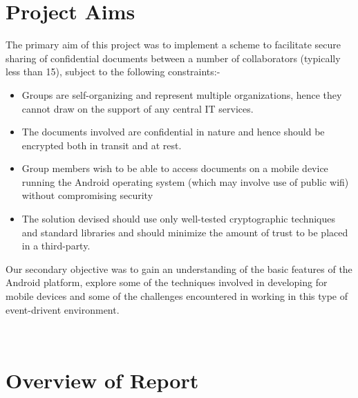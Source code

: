 \section{Project Aims}
\label{sec:aims}
The primary aim of this project was to implement a scheme to facilitate secure sharing of confidential documents between a number of collaborators (typically less than 15), subject to the following constraints:-
\begin{itemize}
\item Groups are self-organizing and represent multiple organizations, hence they cannot draw on the support of any central IT services.
\item The documents involved are confidential in nature and hence should be encrypted both in transit and at rest.
\item Group members wish to be able to access documents on a mobile device running the Android operating system (which may involve use of public wifi) without compromising security 
\item The solution devised should use only well-tested cryptographic techniques and standard libraries and should minimize the amount of trust to be placed in a third-party.
\end{itemize}

Our secondary objective was to gain an understanding of the basic features of the Android platform, explore some of the techniques involved in developing  for mobile devices and some of the challenges encountered in working in this type of event-drivent environment.

\\

\section{Overview of Report}
\label{sec:overview}

